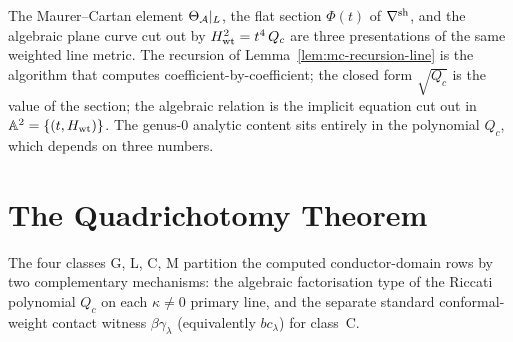 \begin{remark}
\label{rem:three-names-one-object}
The Maurer--Cartan element $\Theta_{\mathcal{A}}|_L$, the flat section
$\Phi(t)$ of $\nabla^{\rm sh}$, and the algebraic plane curve cut out
by $H_{\rm wt}^{2} = t^{4}\,Q_c$ are three presentations of the same
weighted line metric.
The recursion of Lemma~\ref{lem:mc-recursion-line} is the algorithm
that computes coefficient-by-coefficient; the closed form
$\sqrt{Q_c}$ is the value of the section; the algebraic relation is
the implicit equation cut out in
$\mathbb A^{2} = \{(t, H_{\rm wt})\}$. The genus-$0$ analytic content sits
entirely in the polynomial $Q_c$, which depends on three numbers.
\end{remark}

\section{The Quadrichotomy Theorem}
\label{sec:quadrichotomy-theorem}

The four classes G, L, C, M partition the computed conductor-domain
rows by two complementary mechanisms: the algebraic factorisation type
of the Riccati polynomial $Q_c$ on each $\kappa \neq 0$ primary line,
and the separate standard conformal-weight contact witness
$\beta\gamma_\lambda$ \textup{(}equivalently $bc_\lambda$\textup{)}
for class~C.

